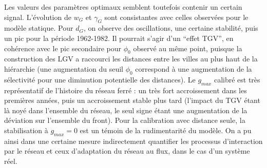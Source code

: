 Les valeurs des paramètres optimaux semblent toutefois contenir un certain signal. L'évolution de $w_G$ et $\gamma_G$ sont consistantes avec celles observées pour le modèle statique. Pour $d_G$, on observe des oscillations, une certaine stabilité, puis un pic pour la période 1962-1982. Il pourrait s'agir d'un ``effet TGV'', en cohérence avec le pic secondaire pour $\phi_0$ observé au même point, puisque la construction des LGV a raccourci les distances entre les villes au plus haut de la hiérarchie (une augmentation du seuil $\phi_0$ correspond à une augmentation de la sélectivité pour une diminution potentielle des distances). Le $g_{max}$ calibré est très représentatif de l'histoire du réseau ferré : un très fort accroissement dans les premières années, puis un accroissement stable plus tard (l'impact du TGV étant là noyé dans l'ensemble du réseau, le seul signe étant une augmentation de la déviation sur l'ensemble du front). Pour la calibration avec distance seule, la stabilisation à $g_{max}=0$ est un témoin de la rudimentarité du modèle. On a pu ainsi dans une certaine mesure indirectement quantifier les processus d'interaction par le réseau et ceux d'adaptation du réseau au flux, dans le cas d'un système réel.

